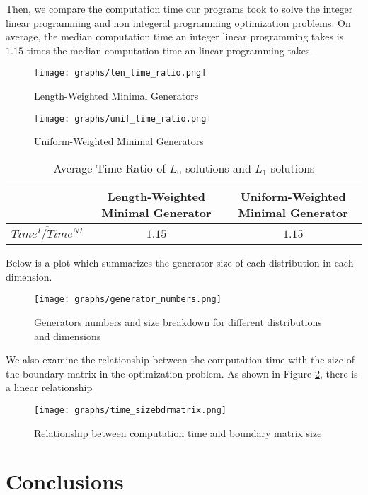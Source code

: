 \documentclass[11pt]{article}
\begin{document}
Then, we compare the computation time our programs took to solve the integer linear programming and non integeral programming optimization problems. On average, the median computation time an integer linear programming takes is $1.15$ times the median computation time an linear programming takes.  

\begin{figure}[!h]
  \centering
  \begin{minipage}[b]{0.45\textwidth}
    \texttt{[image: graphs/len\_time\_ratio.png]}
    \caption{Length-Weighted Minimal Generators}
  \end{minipage}
  \hfill
  \begin{minipage}[b]{0.45\textwidth}
    \texttt{[image: graphs/unif\_time\_ratio.png]}
    \caption{Uniform-Weighted Minimal Generators}
  \end{minipage}
\end{figure}

\begin{table}[h]
    \begin{tabular}{|c|c|c|}
    \hline
         & Length-Weighted Minimal Generator & Uniform-Weighted Minimal Generator\\ \hline
         $\overline{Time^{I} / Time^{NI}}$ & $1.15$  & $1.15$ \\ \hline
    \end{tabular}
    \caption{Average Time Ratio of $L_0$ solutions and $L_1$ solutions}
    \label{tab:my_label}
\end{table}

Below is a plot which summarizes the generator size of each distribution in each dimension. 

\begin{figure}[h]
    \centering
    \texttt{[image: graphs/generator\_numbers.png]}
    \caption{Generators numbers and size breakdown for different distributions and dimensions}
    \label{fig:my_label}
\end{figure}

We also examine the relationship between the computation time with the size of the boundary matrix in the optimization problem. As shown in Figure \ref{fig:lm}, there is a linear relationship

\begin{figure}[h]
    \centering
    \texttt{[image: graphs/time\_sizebdrmatrix.png]}
    \caption{Relationship between computation time and boundary matrix size}
    \label{fig:lm}
\end{figure}

\newpage
\section{Conclusions}



\end{document}
